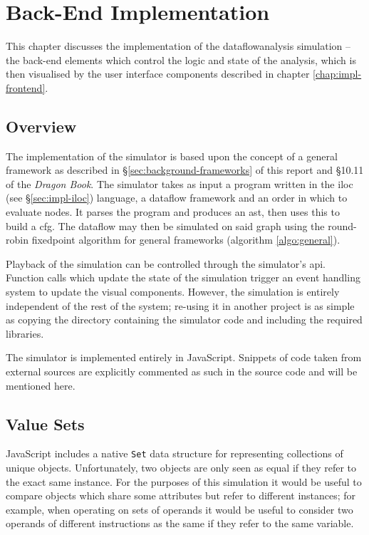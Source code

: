 \documentclass[bsc,twoside,singlespacing,parskip,logo,notimes,normalheadings]{infthesis}
\begin{document}
    

\chapter{Back-End Implementation}\label{chap:impl-backend}
This chapter discusses the implementation of the
\gls{dataflowanalysis} simulation -- the back-end elements which
control the logic and state of the analysis, which is then visualised
by the user interface components described in chapter
\ref{chap:impl-frontend}.

    \section{Overview}
    The implementation of the simulator is based upon the concept of a
    general framework as described in
    \S\ref{sec:background-frameworks} of this report and \S10.11 of
    the {\em Dragon Book}\cite{dragonbook}. The simulator takes as
    input a program written in the \gls{iloc} (see
    \S\ref{sec:impl-iloc}) language, a \gls{dataflow} framework and an
    order in which to evaluate nodes. It parses the program and
    produces an \gls{ast}, then uses this to build a \gls{cfg}. The
    \gls{dataflow} may then be simulated on said graph using the
    round-robin \gls{fixedpoint} algorithm for general frameworks
    (algorithm \ref{algo:general}).

    Playback of the simulation can be controlled through the
    simulator's \gls{api}. Function calls which update the state of
    the simulation trigger an event handling system to update the
    visual components. However, the simulation is entirely independent
    of the rest of the system; re-using it in another project is as
    simple as copying the directory containing the simulator code and
    including the required libraries.

    The simulator is implemented entirely in JavaScript. Snippets of
    code taken from external sources are explicitly commented as such
    in the source code and will be mentioned here.

    \section{Value Sets}

    JavaScript includes a native {\tt Set} data structure for
    representing collections of unique objects. Unfortunately, two
    objects are only seen as equal if they refer to the exact same
    instance. For the purposes of this simulation it would be useful
    to compare objects which share some attributes but refer to
    different instances; for example, when operating on sets of
    operands it would be useful to consider two operands of different
    instructions as the same if they refer to the same variable.
\end{document}

